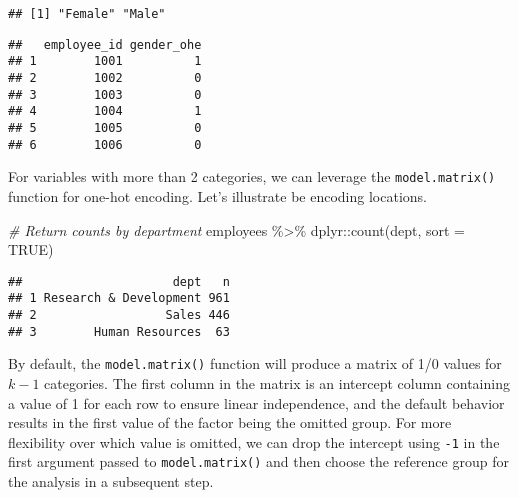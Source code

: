 \documentclass[
]{book}
\newenvironment{Shaded}{\begin{snugshade}}{\end{snugshade}}
\newcommand{\AttributeTok}[1]{\textcolor[rgb]{0.77,0.63,0.00}{#1}}
\newcommand{\CommentTok}[1]{\textcolor[rgb]{0.56,0.35,0.01}{\textit{#1}}}
\newcommand{\ConstantTok}[1]{\textcolor[rgb]{0.00,0.00,0.00}{#1}}
\newcommand{\DecValTok}[1]{\textcolor[rgb]{0.00,0.00,0.81}{#1}}
\newcommand{\FunctionTok}[1]{\textcolor[rgb]{0.00,0.00,0.00}{#1}}
\newcommand{\NormalTok}[1]{#1}
\newcommand{\OtherTok}[1]{\textcolor[rgb]{0.56,0.35,0.01}{#1}}
\newcommand{\SpecialCharTok}[1]{\textcolor[rgb]{0.00,0.00,0.00}{#1}}
\newcommand{\StringTok}[1]{\textcolor[rgb]{0.31,0.60,0.02}{#1}}
\begin{document}
\begin{verbatim}
## [1] "Female" "Male"
\end{verbatim}

\begin{Shaded}
\end{Shaded}

\begin{verbatim}
##   employee_id gender_ohe
## 1        1001          1
## 2        1002          0
## 3        1003          0
## 4        1004          1
## 5        1005          0
## 6        1006          0
\end{verbatim}

For variables with more than 2 categories, we can leverage the \texttt{model.matrix()} function for one-hot encoding. Let's illustrate be encoding locations.

\begin{Shaded}
\begin{Highlighting}[]
\CommentTok{\# Return counts by department}
\NormalTok{employees }\SpecialCharTok{\%\textgreater{}\%}\NormalTok{ dplyr}\SpecialCharTok{::}\FunctionTok{count}\NormalTok{(dept, }\AttributeTok{sort =} \ConstantTok{TRUE}\NormalTok{)}
\end{Highlighting}
\end{Shaded}

\begin{verbatim}
##                     dept   n
## 1 Research & Development 961
## 2                  Sales 446
## 3        Human Resources  63
\end{verbatim}

By default, the \texttt{model.matrix()} function will produce a matrix of 1/0 values for \(k-1\) categories. The first column in the matrix is an intercept column containing a value of 1 for each row to ensure linear independence, and the default behavior results in the first value of the factor being the omitted group. For more flexibility over which value is omitted, we can drop the intercept using \texttt{-1} in the first argument passed to \texttt{model.matrix()} and then choose the reference group for the analysis in a subsequent step.
\end{document}
